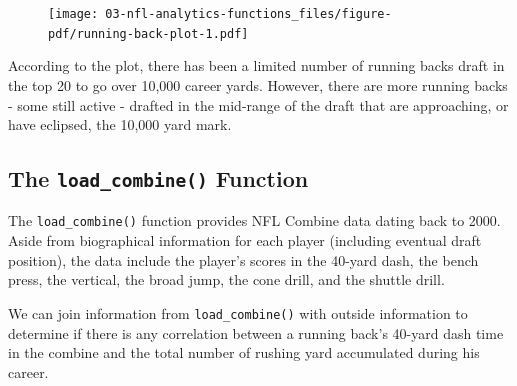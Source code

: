 \documentclass[
  letterpaper,
]{krantz}
\begin{document}
\begin{figure}[H]

{\centering \texttt{[image: 03-nfl-analytics-functions\_files/figure-pdf/running-back-plot-1.pdf]}

}

\end{figure}

According to the plot, there has been a limited number of running backs
draft in the top 20 to go over 10,000 career yards. However, there are
more running backs - some still active - drafted in the mid-range of the
draft that are approaching, or have eclipsed, the 10,000 yard mark.

\hypertarget{the-load_combine-function}{%
\subsection{\texorpdfstring{The \texttt{load\_combine()}
Function}{The load\_combine() Function}}\label{the-load_combine-function}}

The \texttt{load\_combine()} function provides NFL Combine data dating
back to 2000. Aside from biographical information for each player
(including eventual draft position), the data include the player's
scores in the 40-yard dash, the bench press, the vertical, the broad
jump, the cone drill, and the shuttle drill.

We can join information from \texttt{load\_combine()} with outside
information to determine if there is any correlation between a running
back's 40-yard dash time in the combine and the total number of rushing
yard accumulated during his career.
\end{document}
